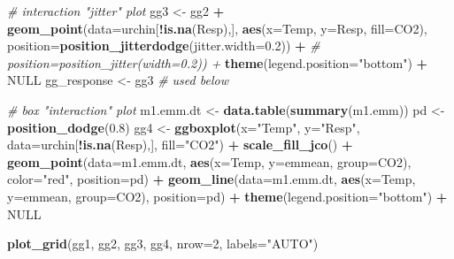 \documentclass[]{book}
\newenvironment{Shaded}{\begin{snugshade}}{\end{snugshade}}
\newcommand{\CommentTok}[1]{\textcolor[rgb]{0.56,0.35,0.01}{\textit{#1}}}
\newcommand{\DataTypeTok}[1]{\textcolor[rgb]{0.13,0.29,0.53}{#1}}
\newcommand{\DecValTok}[1]{\textcolor[rgb]{0.00,0.00,0.81}{#1}}
\newcommand{\FloatTok}[1]{\textcolor[rgb]{0.00,0.00,0.81}{#1}}
\newcommand{\KeywordTok}[1]{\textcolor[rgb]{0.13,0.29,0.53}{\textbf{#1}}}
\newcommand{\NormalTok}[1]{#1}
\newcommand{\OperatorTok}[1]{\textcolor[rgb]{0.81,0.36,0.00}{\textbf{#1}}}
\newcommand{\OtherTok}[1]{\textcolor[rgb]{0.56,0.35,0.01}{#1}}
\newcommand{\StringTok}[1]{\textcolor[rgb]{0.31,0.60,0.02}{#1}}
\begin{document}
\begin{Shaded}
\begin{Highlighting}[]
\CommentTok{# interaction "jitter" plot}
\NormalTok{gg3 <-}\StringTok{ }\NormalTok{gg2 }\OperatorTok{+}
\StringTok{  }\KeywordTok{geom_point}\NormalTok{(}\DataTypeTok{data=}\NormalTok{urchin[}\OperatorTok{!}\KeywordTok{is.na}\NormalTok{(Resp),], }\KeywordTok{aes}\NormalTok{(}\DataTypeTok{x=}\NormalTok{Temp, }\DataTypeTok{y=}\NormalTok{Resp, }\DataTypeTok{fill=}\NormalTok{CO2),}
             \DataTypeTok{position=}\KeywordTok{position_jitterdodge}\NormalTok{(}\DataTypeTok{jitter.width=}\FloatTok{0.2}\NormalTok{)) }\OperatorTok{+}
\CommentTok{#             position=position_jitter(width=0.2)) +}
\StringTok{  }\KeywordTok{theme}\NormalTok{(}\DataTypeTok{legend.position=}\StringTok{"bottom"}\NormalTok{) }\OperatorTok{+}
\StringTok{  }\OtherTok{NULL}
\NormalTok{gg_response <-}\StringTok{ }\NormalTok{gg3 }\CommentTok{# used below}

\CommentTok{# box "interaction" plot}
\NormalTok{m1.emm.dt <-}\StringTok{ }\KeywordTok{data.table}\NormalTok{(}\KeywordTok{summary}\NormalTok{(m1.emm))}
\NormalTok{pd <-}\StringTok{ }\KeywordTok{position_dodge}\NormalTok{(}\FloatTok{0.8}\NormalTok{)}
\NormalTok{gg4 <-}\StringTok{ }\KeywordTok{ggboxplot}\NormalTok{(}\DataTypeTok{x=}\StringTok{"Temp"}\NormalTok{,}
          \DataTypeTok{y=}\StringTok{"Resp"}\NormalTok{,}
          \DataTypeTok{data=}\NormalTok{urchin[}\OperatorTok{!}\KeywordTok{is.na}\NormalTok{(Resp),],}
          \DataTypeTok{fill=}\StringTok{"CO2"}\NormalTok{) }\OperatorTok{+}
\StringTok{  }\KeywordTok{scale_fill_jco}\NormalTok{() }\OperatorTok{+}
\StringTok{  }\KeywordTok{geom_point}\NormalTok{(}\DataTypeTok{data=}\NormalTok{m1.emm.dt, }
             \KeywordTok{aes}\NormalTok{(}\DataTypeTok{x=}\NormalTok{Temp, }\DataTypeTok{y=}\NormalTok{emmean, }\DataTypeTok{group=}\NormalTok{CO2),}
             \DataTypeTok{color=}\StringTok{"red"}\NormalTok{,}
             \DataTypeTok{position=}\NormalTok{pd) }\OperatorTok{+}
\StringTok{  }\KeywordTok{geom_line}\NormalTok{(}\DataTypeTok{data=}\NormalTok{m1.emm.dt, }
            \KeywordTok{aes}\NormalTok{(}\DataTypeTok{x=}\NormalTok{Temp, }\DataTypeTok{y=}\NormalTok{emmean, }\DataTypeTok{group=}\NormalTok{CO2),}
            \DataTypeTok{position=}\NormalTok{pd) }\OperatorTok{+}
\StringTok{  }\KeywordTok{theme}\NormalTok{(}\DataTypeTok{legend.position=}\StringTok{"bottom"}\NormalTok{) }\OperatorTok{+}
\StringTok{  }\OtherTok{NULL}

\KeywordTok{plot_grid}\NormalTok{(gg1, gg2, gg3, gg4, }\DataTypeTok{nrow=}\DecValTok{2}\NormalTok{, }\DataTypeTok{labels=}\StringTok{"AUTO"}\NormalTok{)}
\end{Highlighting}
\end{Shaded}
\end{document}
